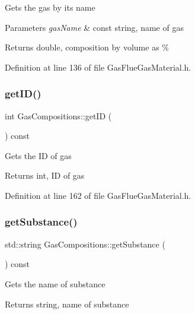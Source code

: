 Gets the gas by its name


\begin{DoxyParams}{Parameters}
{\em gas\+Name} & const string, name of gas\\
\hline
\end{DoxyParams}
\begin{DoxyReturn}{Returns}
double, composition by volume as \% 
\end{DoxyReturn}


Definition at line 136 of file Gas\+Flue\+Gas\+Material.\+h.

\mbox{\label{class_gas_compositions_a9668decdb2b5065c8ee3c59c207b9d51}} 
\subsubsection{\texorpdfstring{get\+I\+D()}{getID()}}
{\footnotesize\ttfamily int Gas\+Compositions\+::get\+ID (\begin{DoxyParamCaption}{ }\end{DoxyParamCaption}) const\hspace{0.3cm}{\ttfamily [inline]}}

Gets the ID of gas

\begin{DoxyReturn}{Returns}
int, ID of gas 
\end{DoxyReturn}


Definition at line 162 of file Gas\+Flue\+Gas\+Material.\+h.

\mbox{\label{class_gas_compositions_abad9554bca9b68cd970eae11bdd3c505}} 
\subsubsection{\texorpdfstring{get\+Substance()}{getSubstance()}}
{\footnotesize\ttfamily std\+::string Gas\+Compositions\+::get\+Substance (\begin{DoxyParamCaption}{ }\end{DoxyParamCaption}) const}

Gets the name of substance

\begin{DoxyReturn}{Returns}
string, name of substance 
\end{DoxyReturn}


